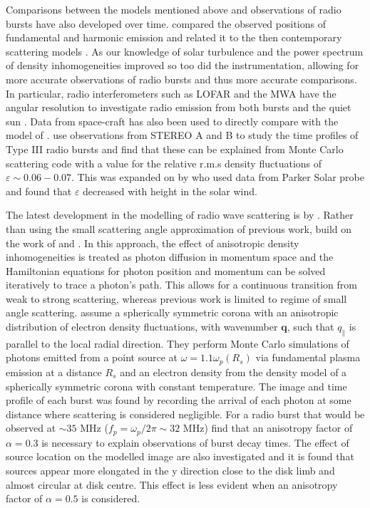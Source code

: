 Comparisons between the models mentioned above and observations of radio bursts have also developed over time. \cite{Stewart1972} compared the observed positions of fundamental and harmonic emission and related it to the then contemporary scattering models \citep[e.g.][]{Fokker1965,Steinberg1971,Riddle1974}. As our knowledge of solar turbulence and the power spectrum of density inhomogeneities improved so too did the instrumentation, allowing for more accurate observations of radio bursts and thus more accurate comparisons. In particular, radio interferometers such as LOFAR and the MWA have the angular resolution to investigate radio emission from both bursts \citep{Zhang2020} and the quiet sun \citep{Sharma2020}. Data from space-craft has also been used to directly compare with the model of \cite{Thejappa2007}.\cite{Krupar2018} use observations from STEREO A and B to study the time profiles of Type III radio bursts and find that these can be explained from Monte Carlo scattering code with a value for the relative r.m.s density fluctuations of $\varepsilon \sim 0.06-0.07$. This was expanded on by \cite{Krupar2020} who used data from Parker Solar probe and found that $\varepsilon$ decreased with height in the solar wind.

The latest development in the modelling of radio wave scattering is by \cite{Kontar2019}. Rather than using the small scattering angle approximation of previous work, \cite{Kontar2019} build on the work of \cite{Arzner1999} and \cite{Bian2019}. In this approach, the effect of anisotropic density inhomogeneities is treated as photon diffusion in momentum space and the Hamiltonian equations for photon position and momentum can be solved iteratively to trace a photon's path. This allows for a continuous transition from weak to strong scattering, whereas previous work is limited to regime of small angle scattering. \cite{Kontar2019} assume a spherically symmetric corona with an anisotropic distribution of electron density fluctuations, with wavenumber $\mathbf{q}$, such that $q_\parallel$ is parallel to the local radial direction. They perform Monte Carlo simulations of photons emitted from a point source at $\omega = 1.1 \omega_p(R_s)$ via fundamental plasma emission at a distance $R_s$ and an electron density from the \cite{Parker1960} density model of a spherically symmetric corona with constant temperature. The image and time profile of each burst was found by recording the arrival of each photon at some distance where scattering is considered negligible. For a radio burst that would be observed at $\sim 35$ MHz ($f_p = \omega_p/2 \pi \sim 32$ MHz) \cite{Kontar2019} find that an anisotropy factor of $\alpha = 0.3$ is necessary to explain observations of burst decay times. The effect of source location on the modelled image are also investigated and it is found that sources appear more elongated in the y direction close to the disk limb and almost circular at disk centre. This effect is less evident when an anisotropy factor of $\alpha = 0.5$ is considered.

